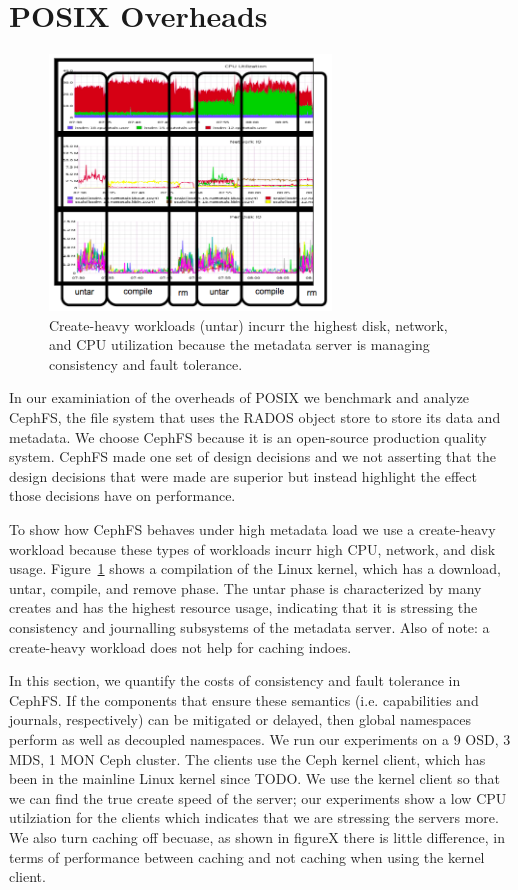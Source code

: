 \section{POSIX Overheads}
\label{sec:posix-overheads}

\begin{figure}[tb]
\centering
\includegraphics[width=75mm]{figures/creates-motivation.png}
\caption{Create-heavy workloads (untar) incurr the highest disk, network, and CPU
utilization because the metadata server is managing consistency and fault
tolerance.}\label{fig:creates-motivation}
\end{figure}

In our examiniation of the overheads of POSIX we benchmark and analyze CephFS,
the file system that uses the RADOS object store to store its data and
metadata. We choose CephFS because it is an open-source production quality
system. CephFS made one set of design decisions and we not asserting that the
design decisions that were made are superior but instead highlight the
effect those decisions have on performance.

To show how CephFS behaves under high metadata load we use a create-heavy
workload because these types of workloads incurr high CPU, network, and disk
usage.  Figure~\ref{fig:creates-motivation} shows a compilation of the Linux
kernel, which has a download, untar, compile, and remove phase. The untar phase
is characterized by many creates and has the highest resource usage, indicating
that it is stressing the consistency and journalling subsystems of the metadata
server. Also of note: a create-heavy workload does not help for caching indoes.

In this section, we quantify the costs of consistency and fault tolerance in
CephFS. If the components that ensure these semantics (i.e. capabilities and
journals, respectively) can be mitigated or delayed, then global namespaces
perform as well as decoupled namespaces. We run our experiments on a 9 OSD, 3
MDS, 1 MON Ceph cluster. The clients use the Ceph kernel client, which has been
in the mainline Linux kernel since TODO. We use the kernel client so that we
can find the true create speed of the server; our experiments show a low CPU
utilziation for the clients which indicates that we are stressing the servers
more. We also turn caching off becuase, as shown in figureX there is little
difference, in terms of performance between caching and not caching when using
the kernel client.

